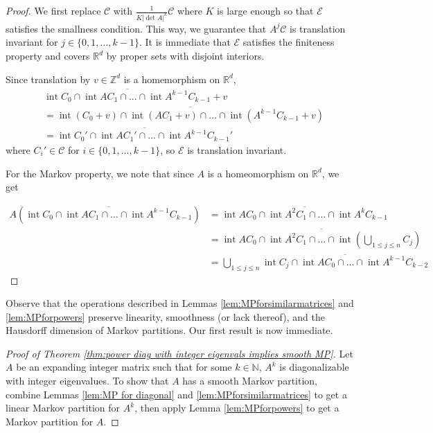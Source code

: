 \documentclass{article}
\def\N{\mathbb{N}}
\def\R{\mathbb{R}}
\def\Z{\mathbb{Z}}
\begin{document}
\begin{proof}
    We first replace $\mathcal{C}$ with $\frac{1}{K|\det A|^k}\mathcal{C}$ where $K$ is large enough so that $\mathcal{E}$ satisfies the smallness condition. This way, we guarantee that $A^j\mathcal{C}$ is translation invariant for $j\in\{0,1,...,k-1\}$. It is immediate that $\mathcal{E}$ satisfies the finiteness property and covers $\R^d$ by proper sets with disjoint interiors. 

    Since translation by $v\in\Z^d$ is a homemorphism on $\R^d$, \begin{align*}
        &\overline{\operatorname{int}C_0\cap \operatorname{int}AC_1\cap...\cap\operatorname{int}A^{k-1}C_{k-1}} +v \\
        &= \overline{\operatorname{int}(C_0+v)\cap \operatorname{int}(AC_1+v)\cap...\cap\operatorname{int}(A^{k-1}C_{k-1}+v)} \\
        &= \overline{\operatorname{int}C_0'\cap \operatorname{int}AC_1'\cap...\cap\operatorname{int}A^{k-1}C_{k-1}'}
    \end{align*}
    where $C_i' \in \mathcal{C}$ for $i\in\{0,1,...,k-1\}$, so $\mathcal{E}$ is translation invariant.

    For the Markov property, we note that since $A$ is a homeomorphism on $\R^d$, we get

    \begin{align*}
        A\left(\overline{\operatorname{int}C_0\cap \operatorname{int}AC_1\cap...\cap\operatorname{int}A^{k-1}C_{k-1}}\right)&=\overline{\operatorname{int} AC_0\cap \operatorname{int} A^2C_1\cap... \cap \operatorname{int}A^kC_{k-1}} \\
        &= \overline{\operatorname{int} AC_0\cap \operatorname{int} A^2C_1\cap... \cap \operatorname{int}\left(\bigcup_{1\leq j\leq n} C_j\right)} \\
        &= \bigcup_{1\leq j\leq n} \overline{\operatorname{int}C_j\cap\operatorname{int}AC_0\cap...\cap \operatorname{int}A^{k-1}C_{k-2}}
    \end{align*}
    
\end{proof}



Observe that the operations described in Lemmas \ref{lem:MPforsimilarmatrices} and \ref{lem:MPforpowers} preserve linearity, smoothness (or lack thereof), and the Hausdorff dimension of Markov partitions. Our first result is now immediate.

\begin{proof}[Proof of Theorem \ref{thm:power diag with integer eigenvals implies smooth MP}]
    Let $A$ be an expanding integer matrix such that for some $k\in \N$, $A^k$ is diagonalizable with integer eigenvalues. To show that $A$ has a smooth Markov partition, combine Lemmas \ref{lem:MP for diagonal} and \ref{lem:MPforsimilarmatrices} to get a linear Markov partition for $A^k$, then apply Lemma \ref{lem:MPforpowers} to get a Markov partition for $A$.
\end{proof}
\end{document}
